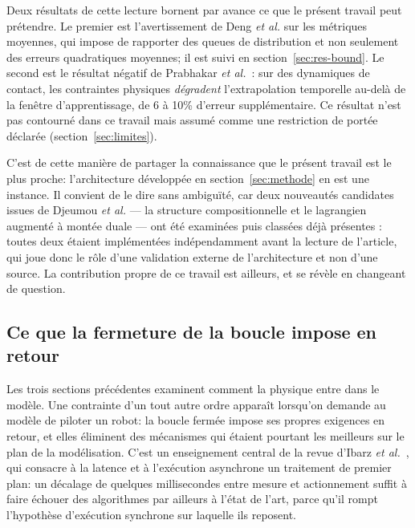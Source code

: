 \documentclass[a4paper, oneside]{article}
\begin{document}
Deux résultats de cette lecture bornent par avance ce que le présent travail
peut prétendre. Le premier est l'avertissement de Deng \emph{et al.} sur les
métriques moyennes, qui impose de rapporter des queues de distribution et non
seulement des erreurs quadratiques moyennes; il est suivi en
section~\ref{sec:res-bound}. Le second est le résultat négatif de
Prabhakar \emph{et al.}~\cite{prabhakar2026}: sur des dynamiques de contact,
les contraintes physiques \emph{dégradent} l'extrapolation temporelle au-delà de
la fenêtre d'apprentissage, de 6 à 10\% d'erreur supplémentaire. Ce résultat
n'est pas contourné dans ce travail mais assumé comme une restriction de portée
déclarée (section~\ref{sec:limites}).

C'est de cette manière de partager la connaissance que le présent travail est
le plus proche: l'architecture développée en section~\ref{sec:methode} en est
une instance. Il convient de le dire sans ambiguïté, car deux nouveautés
candidates issues de Djeumou \emph{et al.} — la structure compositionnelle et le
lagrangien augmenté à montée duale — ont été examinées puis classées \og déjà
présentes \fg{}: toutes deux étaient implémentées indépendamment avant la
lecture de l'article, qui joue donc le rôle d'une validation externe de
l'architecture et non d'une source. La contribution propre de ce travail est
ailleurs, et se révèle en changeant de question.

\subsection{Ce que la fermeture de la boucle impose en retour}
\label{sec:sota-boucle}

Les trois sections précédentes examinent comment la physique entre dans le
modèle. Une contrainte d'un tout autre ordre apparaît lorsqu'on demande au
modèle de piloter un robot: la boucle fermée impose ses propres exigences en
retour, et elles éliminent des mécanismes qui étaient pourtant les meilleurs sur
le plan de la modélisation. C'est un enseignement central de la revue
d'Ibarz \emph{et al.}~\cite{ibarz2021}, qui consacre à la latence et à
l'exécution asynchrone un traitement de premier plan: un décalage de quelques
millisecondes entre mesure et actionnement suffit à faire échouer des
algorithmes par ailleurs à l'état de l'art, parce qu'il rompt l'hypothèse
d'exécution synchrone sur laquelle ils reposent.
\end{document}

